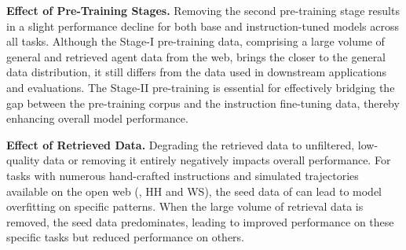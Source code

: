 \noindent\textbf{Effect of Pre-Training Stages.}
Removing the second pre-training stage results in a slight performance decline for both base and instruction-tuned models across all tasks. Although the Stage-I pre-training data, comprising a large volume of general and retrieved agent data from the web, brings the \dataset closer to the general data distribution, it still differs from the data used in downstream applications and evaluations. The Stage-II pre-training is essential for effectively bridging the gap between the pre-training corpus and the instruction fine-tuning data, thereby enhancing overall model performance.

\noindent\textbf{Effect of Retrieved Data.}
Degrading the retrieved data to unfiltered, low-quality data or removing it entirely negatively impacts overall performance.
For tasks with numerous hand-crafted instructions and simulated trajectories available on the open web (\eg, HH and WS), the seed data of \dataset can lead to model overfitting on specific patterns.
When the large volume of retrieval data is removed, the seed data predominates, leading to improved performance on these specific tasks but reduced performance on others.





